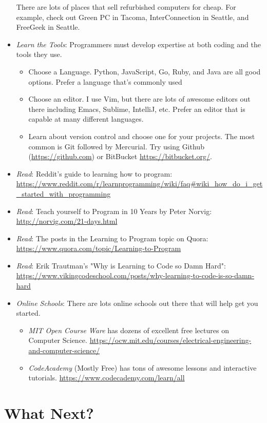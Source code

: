 \documentclass{article}
\begin{document}
\begin{itemize}
There are lots of places that sell refurbished computers for cheap. For
example, check out Green PC in Tacoma, InterConnection in Seattle, and FreeGeek
in Seattle.
\item \textit{Learn the Tools}: Programmers must develop expertise at both coding and the tools they use.
  \begin{itemize}
  \item Choose a Language. Python, JavaScript, Go, Ruby, and Java are all good
  options. Prefer a language that's commonly used
  \item Choose an editor. I use Vim, but there are lots of awesome editors out
  there including Emacs, Sublime, IntelliJ, etc.  Prefer an editor that is
  capable at many different languages.
  \item Learn about version control and choose one for your projects. The most
  common is Git followed by Mercurial. Try using Github (\url{https://github.com})
  or BitBucket \url{https://bitbucket.org/}.
  \end{itemize}
\item \textit{Read}: Reddit's guide to learning how to program: \url{https://www.reddit.com/r/learnprogramming/wiki/faq#wiki_how_do_i_get_started_with_programming}
\item \textit{Read}: Teach yourself to Program in 10 Years by Peter Norvig: \url{http://norvig.com/21-days.html}
\item \textit{Read}: The posts in the Learning to Program topic on Quora: \url{https://www.quora.com/topic/Learning-to-Program}
\item \textit{Read}: Erik Trautman's "Why is Learning to Code so Damn Hard": \url{https://www.vikingcodeschool.com/posts/why-learning-to-code-is-so-damn-hard}
\item \textit{Online Schools}: There are lots online schools out there that will help get you started.
  \begin{itemize}
  \item \textit{MIT Open Course Ware} has dozens of excellent free lectures on Computer Science. \url{https://ocw.mit.edu/courses/electrical-engineering-and-computer-science/}
  \item \textit{CodeAcademy} (Mostly Free) has tons of awesome lessons and interactive tutorials. \url{https://www.codecademy.com/learn/all}
  \end{itemize}
\end{itemize}

\section*{What Next?}
\end{document}

